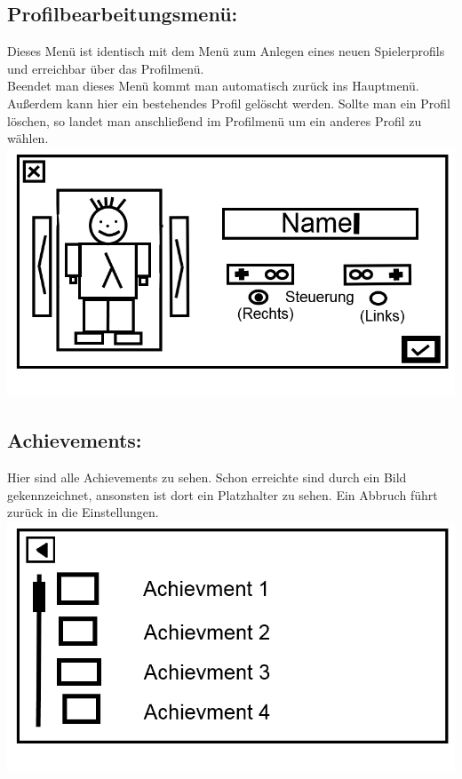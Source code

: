 \documentclass{scrartcl}
\begin{document}
\begin{enumerate}
	\begin{minipage}{1\textwidth}
		\item \subsection*{Profilbearbeitungsmenü:}
		Dieses Menü ist identisch mit dem Menü zum Anlegen eines neuen Spielerprofils und erreichbar über das Profilmenü.\\
		Beendet man dieses Menü kommt man automatisch zurück ins Hauptmenü.\\
		Außerdem kann hier ein bestehendes Profil gelöscht werden. Sollte man ein Profil löschen, so landet man anschließend im Profilmenü um ein anderes Profil zu wählen.
		\includegraphics[width=\textwidth]{assets/CreateProfile2}
	\end{minipage}

	\begin{minipage}{1\textwidth}
		\item \subsection*{Achievements:}
		Hier sind alle Achievements zu sehen. Schon erreichte sind durch ein Bild gekennzeichnet, ansonsten ist dort ein Platzhalter zu sehen. Ein Abbruch führt zurück in die Einstellungen.\\
		\includegraphics[width=\textwidth]{assets/Achievments}
		

\end{minipage}
\end{enumerate}
\end{document}
